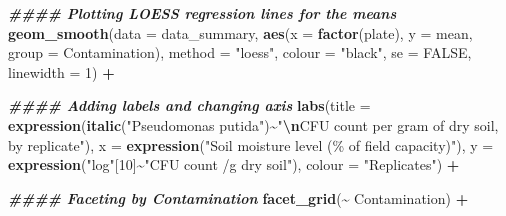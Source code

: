 \documentclass[
]{article}
\newenvironment{Shaded}{\begin{snugshade}}{\end{snugshade}}
\newcommand{\AttributeTok}[1]{\textcolor[rgb]{0.13,0.29,0.53}{#1}}
\newcommand{\ConstantTok}[1]{\textcolor[rgb]{0.56,0.35,0.01}{#1}}
\newcommand{\DecValTok}[1]{\textcolor[rgb]{0.00,0.00,0.81}{#1}}
\newcommand{\DocumentationTok}[1]{\textcolor[rgb]{0.56,0.35,0.01}{\textbf{\textit{#1}}}}
\newcommand{\FunctionTok}[1]{\textcolor[rgb]{0.13,0.29,0.53}{\textbf{#1}}}
\newcommand{\NormalTok}[1]{#1}
\newcommand{\SpecialCharTok}[1]{\textcolor[rgb]{0.81,0.36,0.00}{\textbf{#1}}}
\newcommand{\StringTok}[1]{\textcolor[rgb]{0.31,0.60,0.02}{#1}}
\begin{document}
\begin{Shaded}
\begin{Highlighting}[]
  \DocumentationTok{\#\#\#\# Plotting LOESS regression lines for the means}
  \FunctionTok{geom\_smooth}\NormalTok{(}\AttributeTok{data =}\NormalTok{ data\_summary,}
              \FunctionTok{aes}\NormalTok{(}\AttributeTok{x =} \FunctionTok{factor}\NormalTok{(plate), }
                  \AttributeTok{y =}\NormalTok{ mean,}
                  \AttributeTok{group =}\NormalTok{ Contamination), }
              \AttributeTok{method =} \StringTok{"loess"}\NormalTok{, }
              \AttributeTok{colour =} \StringTok{"black"}\NormalTok{,}
              \AttributeTok{se =} \ConstantTok{FALSE}\NormalTok{, }
              \AttributeTok{linewidth =} \DecValTok{1}\NormalTok{) }\SpecialCharTok{+}
  
  \DocumentationTok{\#\#\#\# Adding labels and changing axis}
  \FunctionTok{labs}\NormalTok{(}\AttributeTok{title =} \FunctionTok{expression}\NormalTok{(}\FunctionTok{italic}\NormalTok{(}\StringTok{"Pseudomonas putida"}\NormalTok{)}\SpecialCharTok{\textasciitilde{}}\StringTok{"}\SpecialCharTok{\textbackslash{}n}\StringTok{CFU count per gram of dry soil, by replicate"}\NormalTok{),}
       \AttributeTok{x =} \FunctionTok{expression}\NormalTok{(}\StringTok{"Soil moisture level (\% of field capacity)"}\NormalTok{),}
       \AttributeTok{y =} \FunctionTok{expression}\NormalTok{(}\StringTok{"log"}\NormalTok{[}\DecValTok{10}\NormalTok{]}\SpecialCharTok{\textasciitilde{}}\StringTok{"CFU count /g dry soil"}\NormalTok{),}
       \AttributeTok{colour =} \StringTok{"Replicates"}\NormalTok{) }\SpecialCharTok{+}
  
  \DocumentationTok{\#\#\#\# Faceting by Contamination}
  \FunctionTok{facet\_grid}\NormalTok{(}\SpecialCharTok{\textasciitilde{}}\NormalTok{ Contamination) }\SpecialCharTok{+}
  

\end{Highlighting}
\end{Shaded}
\end{document}
